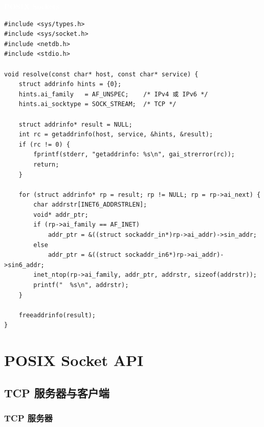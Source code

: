 \documentclass[12pt,a4paper,fontset=fandol]{ctexbook}
\newcommand{\posixlabel}{%
  \noindent\begin{tcolorbox}[sharp corners,colback=posixheadbg,colframe=posixheadbg,
    left=6pt,right=6pt,top=2pt,bottom=2pt,boxrule=0pt]
  \textcolor{white}{\small\bfseries\sffamily POSIX Sockets}\end{tcolorbox}%
}
\begin{document}
\posixlabel
\begin{lstlisting}[style=cstyle]
#include <sys/types.h>
#include <sys/socket.h>
#include <netdb.h>
#include <stdio.h>

void resolve(const char* host, const char* service) {
    struct addrinfo hints = {0};
    hints.ai_family   = AF_UNSPEC;    /* IPv4 或 IPv6 */
    hints.ai_socktype = SOCK_STREAM;  /* TCP */

    struct addrinfo* result = NULL;
    int rc = getaddrinfo(host, service, &hints, &result);
    if (rc != 0) {
        fprintf(stderr, "getaddrinfo: %s\n", gai_strerror(rc));
        return;
    }

    for (struct addrinfo* rp = result; rp != NULL; rp = rp->ai_next) {
        char addrstr[INET6_ADDRSTRLEN];
        void* addr_ptr;
        if (rp->ai_family == AF_INET)
            addr_ptr = &((struct sockaddr_in*)rp->ai_addr)->sin_addr;
        else
            addr_ptr = &((struct sockaddr_in6*)rp->ai_addr)->sin6_addr;
        inet_ntop(rp->ai_family, addr_ptr, addrstr, sizeof(addrstr));
        printf("  %s\n", addrstr);
    }

    freeaddrinfo(result);
}
\end{lstlisting}

\chapter{POSIX Socket API}

\section{TCP 服务器与客户端}

\subsection{TCP 服务器}
\end{document}
